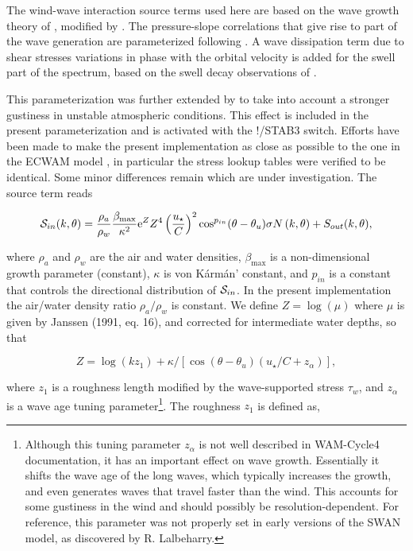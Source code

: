 The wind-wave interaction source terms used here are based on the wave growth
theory of \cite{art:Miles57}, modified by \cite{art:Jan82}. The pressure-slope
correlations that give rise to part of the wave generation are parameterized
following \cite{art:Jan91}. A wave dissipation term due to shear stresses
variations in phase with the orbital velocity is added for the swell part of
the spectrum, based on the swell decay observations of \cite{art:ACC08}.

This parameterization was further extended by \cite{rep:AB02} to take into
account a stronger gustiness in unstable atmospheric conditions. This effect is
included in the present parameterization and is activated with the {\code
!/STAB3} switch. Efforts have been made to make the present implementation as
close as possible to the one in the ECWAM model \citep{rep:Bea05}, in
particular the stress lookup tables were verified to be identical. Some minor
differences remain which are under investigation. The source term reads
\citep{art:Jan91}

\begin{equation}
{\cal S}_{in}(k,\theta) =
\frac{\rho_a}{\rho_w}\frac{\beta_{\mathrm{max}}}{\kappa^2}{\mathrm e}^{Z}Z^4
\left(\frac{u_\star}{C}\right)^2 \cos^{p_{in}}(\theta - \theta_u) \sigma N
\left(k,\theta\right) + S_{out}(k,\theta),\label{eq:SinWAM4}
\end{equation}

\noindent where $\rho_a$ and $\rho_w$ are the air and water densities,
$\beta_{\mathrm{max}}$ is a non-dimensional growth parameter (constant),
$\kappa$ is von K\'{a}rm\'{a}n' constant, and $p_{in}$ is a constant that
controls the directional distribution of ${\cal S}_{in}$. In the present
implementation the air/water density ratio ${\rho_a}/{\rho_w}$ is constant. We
define $Z=\log(\mu)$ where $\mu$ is given by Janssen (1991, eq. 16), and
corrected for intermediate water depths, so that

\begin{equation}
Z=\log(k z_1)+\kappa/\left[\cos\left(\theta - \theta_u\right)
\left(u_\star/C + z_\alpha \right)\right],
\end{equation}

\noindent
where $z_1$ is a roughness length modified by the wave-supported stress
$\tau_w$, and $z_\alpha$ is a wave age tuning parameter\footnote{Although this
tuning parameter $z_\alpha$ is not well described in WAM-Cycle4 documentation,
it has an important effect on wave growth. Essentially it shifts the wave age
of the long waves, which typically increases the growth, and even generates
waves that travel faster than the wind. This accounts for some gustiness in
the wind and should possibly be resolution-dependent. For reference, this
parameter was not properly set in early versions of the SWAN model, as
discovered by R. Lalbeharry.}.  The roughness $z_1$ is defined as,

